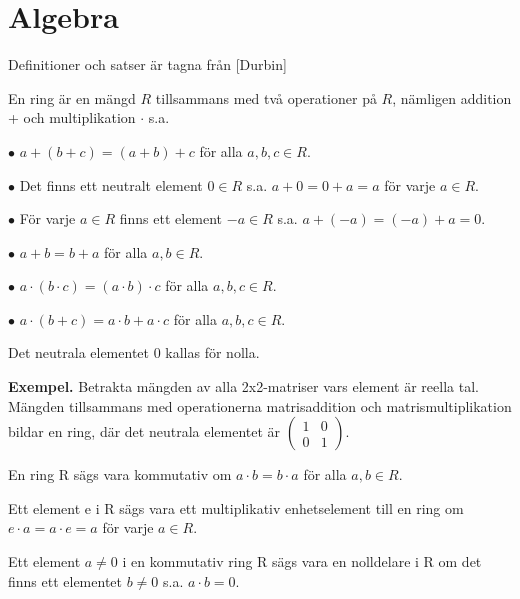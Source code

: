 \section{Algebra}
\label{sec:algebra}
Definitioner och satser är tagna från [Durbin]

\begin{definition}
En ring är en mängd $R$ tillsammans med två operationer på $R$, nämligen addition + och multiplikation $\cdot$ s.a.

$\bullet$ $a+(b+c) = (a+b)+c$ för alla $a,b,c \in R$.

$\bullet$ Det finns ett neutralt element $0 \in R$ s.a. $a+0=0+a=a$ för varje $a \in R$.

$\bullet$ För varje $a \in R$ finns ett element $-a \in R$ s.a. $a + (-a) = (-a) + a = 0$.

$\bullet$ $a + b = b + a$ för alla $a,b \in R$.

$\bullet$ $a \cdot (b \cdot c)=(a \cdot b) \cdot c$ för alla $a,b,c \in R$.

$\bullet$ $a \cdot (b + c) = a \cdot b + a \cdot c$ för alla $a,b,c \in R$.

\noindent
Det neutrala elementet $0$ kallas för nolla.

\end{definition}

\noindent\textbf{Exempel.} Betrakta mängden av alla 2x2-matriser vars element är reella tal. Mängden tillsammans 
med operationerna matrisaddition och matrismultiplikation bildar en ring, där det neutrala elementet är $
\begin{pmatrix}
 1 & 0 \\
 0 & 1
\end{pmatrix}.
$

\begin{definition}
 En ring R sägs vara kommutativ om $a \cdot b = b \cdot a$ för alla $a,b \in R$.
\end{definition}

\begin{definition}
 Ett element e i R sägs vara ett multiplikativ enhetselement till en ring om $e \cdot a = a \cdot e = a$ för varje $a \in R$.
\end{definition}

\begin{definition}
 Ett element $a \neq 0$ i en kommutativ ring R sägs vara en nolldelare i R om det finns ett elementet
$b \neq 0$ s.a. $a \cdot b = 0$.
\end{definition}

